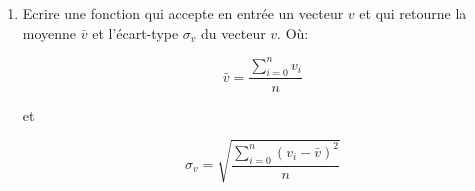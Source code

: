 \documentclass[12pt]{article}
\theoremstyle{HintStyle}
\theoremstyle{ExampleStyle}
\begin{document}
\begin{exercise}
\begin{enumerate}\item Ecrire une fonction qui accepte en entrée un vecteur $v$ et qui retourne la moyenne $\bar{v}$ et l'écart-type $\sigma_v$ du vecteur $v$. Où:

\begin{minipage}{.4\linewidth}
$$\bar{v}=\frac{\sum_{i=0}^n{v_i}}{n}$$
\end{minipage}
et
\begin{minipage}{.4\linewidth}
$$\sigma_v=\sqrt{\frac{\sum_{i=0}^n{(v_i-\bar{v})^2}}{n}}$$
\end{minipage}


\end{enumerate}
\end{exercise}
\end{document}

